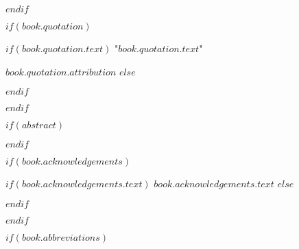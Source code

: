 \cleardoublepage
$endif$

$if(book.quotation)$

\vspace*{0.2\textheight}

$if(book.quotation.text)$
\noindent"{\itshape $book.quotation.text$}"\bigbreak

\hfill $book.quotation.attribution$
$else$

$endif$

$endif$

$if(abstract)$

\begin{abstract}
\addchaptertocentry{\abstractname} %
$abstract$
\end{abstract}

$endif$

$if(book.acknowledgements)$

\begin{acknowledgements}
\addchaptertocentry{\acknowledgementname} %
$if(book.acknowledgements.text)$
$book.acknowledgements.text$
$else$

$endif$
\end{acknowledgements}

$endif$


\tableofcontents %

\listoffigures %

\listoftables %

$if(book.abbreviations)$



